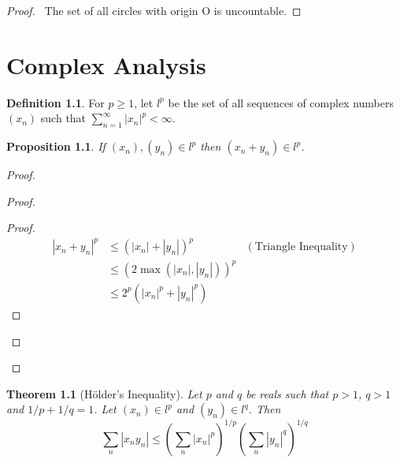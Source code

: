 \documentclass{book}
\let\qed\relax
\newtheorem{prop}[ax]{Proposition}
\newtheorem{thm}[ax]{Theorem}
\theoremstyle{definition}
\newtheorem{df}[ax]{Definition}
\begin{document}
\begin{proof}
\pf\ The set of all circles with origin O is uncountable. \qed
\end{proof}
\chapter{Complex Analysis}

\begin{df}
For $p \geq 1$, let $l^p$ be the set of all sequences of complex numbers $(x_n)$ such that $\sum_{n=1}^\infty |x_n|^p < \infty$.
\end{df}

\begin{prop}
\label{prop:lp_closed_under_addition}
If $(x_n), (y_n) \in l^p$ then $(x_n + y_n) \in l^p$.
\end{prop}

\begin{proof}
\pf
{}
\begin{proof}
	\pf
	\begin{proof}
		\pf
		\begin{align*}
			|x_n + y_n|^p & \leq (|x_n| + |y_n|)^p & (\text{Triangle Inequality}) \\
			& \leq (2 \max(|x_n|,|y_n|))^p \\
			& \leq 2^p (|x_n|^p + |y_n|^p)
		\end{align*}
	\end{proof}
\end{proof}
\qed
\end{proof}

\begin{thm}[H\"{o}lder's Inequality]
Let $p$ and $q$ be reals such that $p > 1$, $q > 1$ and $1/p + 1/q = 1$. Let $(x_n) \in l^p$ and $(y_n) \in l^q$. Then
\[ \sum_n |x_n y_n| \leq \left( \sum_n |x_n|^p \right)^{1/p} \left( \sum_n |y_n|^q \right)^{1/q} \]
\end{thm}
\end{document}
